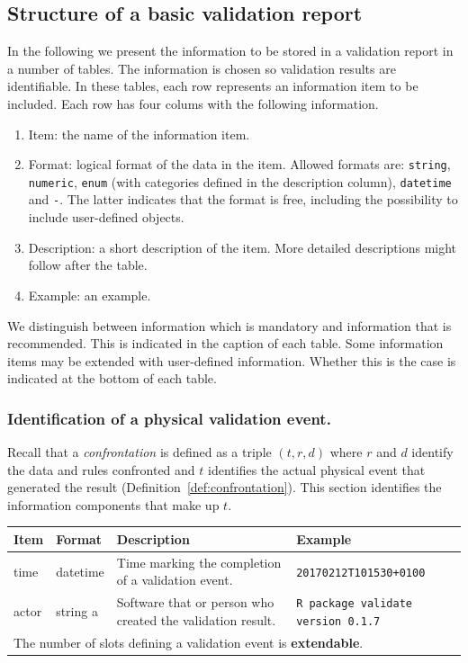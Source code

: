 \documentclass[a4paper, 11pt,titlepage]{article}
\newcommand{\code}[1]{\texttt{#1}}
\begin{document}
\subsection{Structure of a basic validation report}
\label{sect:basicreportstructure}
In the following we present the information to be stored in a validation report
in a number of tables. The information is chosen so validation results are
identifiable. In these tables, each row represents an information item to be
included. Each row has four colums with the following information.
%
\begin{enumerate}
\item Item: the name of the information item.
\item Format: logical format of the data in the item. Allowed formats are: \code{string},
\code{numeric}, \code{enum} (with categories defined in the description
column), \code{datetime} and \code{-}. The latter indicates that the format is
free, including the possibility to include user-defined objects.
\item Description: a short description of the item. More detailed descriptions
might follow after the table.
\item Example: an example.
\end{enumerate}
%
We distinguish between information which is mandatory and information that
is recommended. This is indicated in the caption of each table. Some
information items may be extended with user-defined information. Whether
this is the case is indicated at the bottom of each table.


\subsubsection{Identification of a physical validation event.}
\label{sect:idevent}
Recall that a \emph{confrontation} is defined as a triple $(t,r,d)$ where $r$
and $d$ identify the data and rules confronted and $t$ identifies the actual
physical event that generated the result
(Definition~\ref{def:confrontation}).  This section identifies the
information components that make up $t$.
%
\begin{center}
\label{tab:idve}
\begin{tabular}{|lp{15mm}p{}p{}|}
\hline
\textbf{Item} & \textbf{Format} & \textbf{Description} &\textbf{Example}\\
\hline
time          & datetime & Time marking the completion of a validation event. & \code{20170212T101530+0100}\\
actor         & string        a  & Software that or person who created the validation result. & \code{R package validate version 0.1.7}\\
\hline
\multicolumn{4}{|l|}{The number of slots defining a validation event is \textbf{extendable}.
}\\
\hline
\end{tabular}
\end{center}
\end{document}
